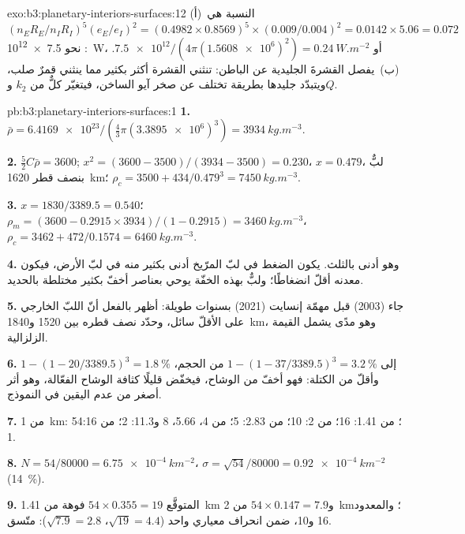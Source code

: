 \begin{solution}{exo:b3:planetary-interiors-surfaces:12}
(أ)~النسبة هي $(n_ER_E/n_IR_I)^5(e_E/e_I)^2 = (0.4982\times0.8569)^5
\times(0.009/0.004)^2 = 0.0142\times5.06 = 0.072$: نحو
\qty{7.5e12}{W}، أو $\num{7.5e12}/(4\pi(\num{1.5608e6})^2) =
\qty{0.24}{W.m^{-2}}$. (ب)~يفصل  القشرةَ الجليدية عن
الباطن: تنثني القشرة أكثر بكثير مما ينثني قمرٌ صلب، ويتبدّد جليدها
بطريقة تختلف عن صخر آيو الساخن، فيتغيّر كلٌّ من $k_2$ و$Q$.
\end{solution}

\begin{solution}{pb:b3:planetary-interiors-surfaces:1}
\textbf{1.} $\bar\rho = \num{6.4169e23}/(\tfrac43\pi(\num{3.3895e6})^3) =
\qty{3934}{kg.m^{-3}}$.

\textbf{2.} $\tfrac52C\bar\rho = 3600$; $x^2 = (3600 - 3500)/(3934 - 3500) =
0.230$، $x = 0.479$، لبٌّ بنصف قطر \qty{1620}{km}؛ $\rho_c = 3500 +
434/0.479^3 = \qty{7450}{kg.m^{-3}}$.

\textbf{3.} $x = 1830/3389.5 = 0.540$؛ $\rho_m = (3600 - 0.2915\times
3934)/(1 - 0.2915) = \qty{3460}{kg.m^{-3}}$، $\rho_c = 3462 +
472/0.1574 = \qty{6460}{kg.m^{-3}}$.

\textbf{4.} وهو أدنى بالثلث. يكون الضغط في لبّ المرّيخ
أدنى بكثير منه في لبّ الأرض، فيكون معدنه أقلّ انضغاطًا؛ ولبٌّ بهذه الخفّة يوحي
بعناصر أخفّ بكثير مختلطة بالحديد.

\textbf{5.} جاء  (2003) قبل مهمّة إنسايت (2021) بسنوات طويلة:
أظهر بالفعل أنّ اللبّ الخارجي على الأقلّ سائل، وحدّد نصف قطره
بين 1520 و\qty{1840}{km}، وهو مدًى يشمل
القيمة الزلزالية.

\textbf{6.} $1 - (1 - 20/3389.5)^3 = \qty{1.8}{\percent}$ إلى $1 - (1 -
37/3389.5)^3 = \qty{3.2}{\percent}$ من الحجم، وأقلّ من الكتلة:
فهو أخفّ من الوشاح، فيخفّض قليلًا كثافة الوشاح الفعّالة،
وهو أثر أصغر من عدم اليقين في النموذج.

\textbf{7.} من \qty{1}{km}: 54؛ من 1.41: 16؛ من 2: 10؛ من 2.83: 5؛
من 4، 5.66، 8 و11.3: 2؛ من 16: 1.

\textbf{8.} $N = 54/80000 = \qty{6.75e-4}{km^{-2}}$، $\sigma = \sqrt{54}/80000
= \qty{0.92e-4}{km^{-2}}$ (\qty{14}{\percent}).

\textbf{9.} المتوقَّع $54\times0.355 = 19$ فوهة من \qty{1.41}{km}
و$54\times0.147 = 7.9$ من \qty{2}{km}؛ والمعدود 16 و10،
ضمن انحراف معياري واحد ($\sqrt{19} = 4.4$، $\sqrt{7.9} = 2.8$): متّسق.


\end{solution}
